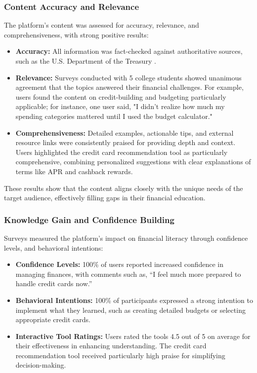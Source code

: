 \documentclass[11pt,twocolumn]{article}
\begin{document}
\subsubsection{Content Accuracy and Relevance}
The platform’s content was assessed for accuracy, relevance, and comprehensiveness, with strong positive results:
\begin{itemize}
    \item \textbf{Accuracy:} All information was fact-checked against authoritative sources, such as the U.S. Department of the Treasury \cite{budgeting}.
    \item \textbf{Relevance:} Surveys conducted with 5 college students showed unanimous agreement that the topics answered their financial challenges. For example, users found the content on credit-building and budgeting particularly applicable; for instance, one user said, "I didn't realize how much my spending categories mattered until I used the budget calculator."
    \item \textbf{Comprehensiveness:} Detailed examples, actionable tips, and external resource links were consistently praised for providing depth and context. Users highlighted the credit card recommendation tool as particularly comprehensive, combining personalized suggestions with clear explanations of terms like APR and cashback rewards.
\end{itemize}

These results show that the content aligns closely with the unique needs of the target audience, effectively filling gaps in their financial education.

\subsubsection{Knowledge Gain and Confidence Building}
Surveys measured the platform’s impact on financial literacy through confidence levels, and behavioral intentions:
\begin{itemize}
    \item \textbf{Confidence Levels:} 100\% of users reported increased confidence in managing finances, with comments such as, “I feel much more prepared to handle credit cards now.”
    \item \textbf{Behavioral Intentions:} 100\% of participants expressed a strong intention to implement what they learned, such as creating detailed budgets or selecting appropriate credit cards.
    \item \textbf{Interactive Tool Ratings:} Users rated the tools 4.5 out of 5 on average for their effectiveness in enhancing understanding. The credit card recommendation tool received particularly high praise for simplifying decision-making.
\end{itemize}
\end{document}
